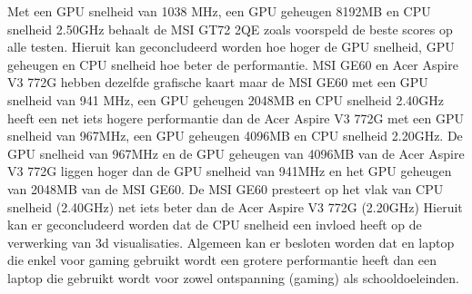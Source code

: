 Met een GPU snelheid van 1038 MHz, een GPU geheugen 8192MB en
CPU snelheid 2.50GHz behaalt de MSI GT72 2QE zoals voorspeld de beste
scores op alle testen. Hieruit kan geconcludeerd worden hoe hoger de GPU snelheid, GPU geheugen en CPU snelheid hoe beter de performantie.
MSI GE60 en Acer Aspire V3 772G  hebben dezelfde grafische kaart maar de MSI GE60 met  een GPU snelheid van 941 MHz, een GPU geheugen 2048MB en
CPU snelheid 2.40GHz heeft een net iets hogere performantie dan de Acer Aspire V3 772G met een GPU snelheid van 967MHz, een GPU geheugen 4096MB en
CPU snelheid 2.20GHz. De GPU snelheid van 967MHz en de GPU geheugen van 4096MB van de Acer Aspire V3 772G liggen hoger dan de GPU snelheid van 941MHz en het GPU geheugen van 2048MB
van de MSI GE60. De MSI GE60 presteert op het vlak van CPU snelheid (2.40GHz) net iets beter dan de Acer Aspire V3 772G (2.20GHz)
Hieruit kan er geconcludeerd worden dat de CPU snelheid een invloed heeft op de verwerking van 3d visualisaties.
Algemeen kan er besloten worden dat en laptop die enkel voor gaming gebruikt wordt een grotere performantie heeft dan een laptop die gebruikt wordt voor zowel ontspanning (gaming)
 als schooldoeleinden.